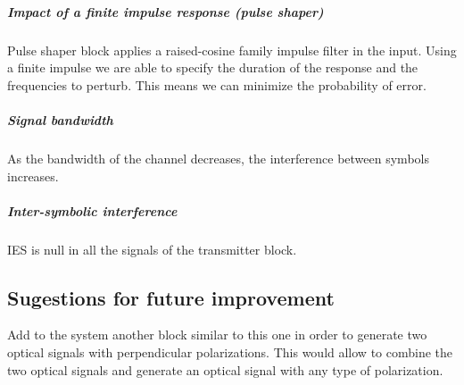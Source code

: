 \subparagraph*{Impact of a finite impulse response (pulse shaper)}
Pulse shaper block applies a raised-cosine family impulse filter in the input. Using a finite impulse we are able to specify the duration of the response and the frequencies to perturb. This means we can minimize the probability of error.
\subparagraph*{Signal bandwidth}
As the bandwidth of the channel decreases, the interference between symbols increases.
\subparagraph*{Inter-symbolic interference}
IES is null in all the signals of the transmitter block.

%

\subsection*{Sugestions for future improvement}

Add to the system another block similar to this one in order to generate two optical signals with perpendicular polarizations. This would allow to combine the two optical signals and generate an optical signal with any type of polarization.
